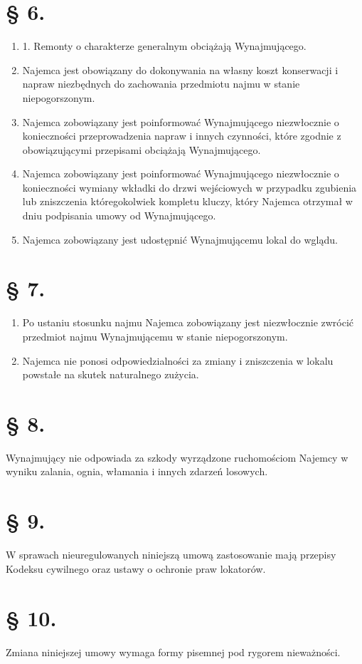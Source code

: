 \documentclass[a4paper,11pt, notitlepage]{article}
\begin{document}
\section*{§ 6.}
    \begin{enumerate}
        \item 1. Remonty o charakterze generalnym obciążają Wynajmującego.
        \item Najemca jest obowiązany do dokonywania na własny koszt konserwacji i napraw niezbędnych do zachowania przedmiotu najmu w stanie niepogorszonym.
        \item Najemca zobowiązany jest poinformować Wynajmującego niezwłocznie o konieczności przeprowadzenia napraw i innych czynności, które zgodnie z obowiązującymi przepisami obciążają Wynajmującego.
        \item Najemca zobowiązany jest poinformować Wynajmującego niezwłocznie o konieczności wymiany wkładki do drzwi wejściowych w przypadku 	zgubienia lub zniszczenia któregokolwiek kompletu kluczy, który Najemca otrzymał w dniu podpisania umowy od Wynajmującego.
        \item Najemca zobowiązany jest udostępnić Wynajmującemu lokal do wglądu.
\end{enumerate}
\section*{§ 7.}
    \begin{enumerate}
        \item Po ustaniu stosunku najmu Najemca zobowiązany jest niezwłocznie zwrócić przedmiot najmu Wynajmującemu w stanie niepogorszonym.
        \item Najemca nie ponosi odpowiedzialności za zmiany i zniszczenia w 	lokalu powstałe na skutek naturalnego zużycia.
    \end{enumerate}
\section*{§ 8.}
Wynajmujący nie odpowiada za szkody wyrządzone ruchomościom Najemcy w wyniku zalania, ognia, włamania i innych zdarzeń losowych.
\section*{§ 9.}
W sprawach nieuregulowanych niniejszą umową zastosowanie mają przepisy Kodeksu cywilnego oraz ustawy o ochronie praw lokatorów.
\section*{§ 10.}
Zmiana niniejszej umowy wymaga formy pisemnej pod rygorem nieważności.
\end{document}
